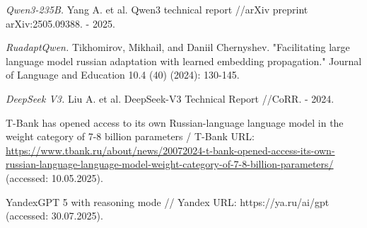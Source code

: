 \documentclass{superfri}
\begin{document}
\begin{thebibliography}{99}
\textit{Qwen3-235B.}
Yang A. et al. Qwen3 technical report //arXiv preprint arXiv:2505.09388. - 2025.

\textit{RuadaptQwen.}
Tikhomirov, Mikhail, and Daniil Chernyshev. "Facilitating large language model russian adaptation with learned embedding propagation." Journal of Language and Education 10.4 (40) (2024): 130-145.

\textit{DeepSeek V3.}
Liu A. et al. DeepSeek-V3 Technical Report //CoRR. - 2024.

T-Bank has opened access to its own Russian-language language model in the weight category of 7-8 billion parameters / T-Bank URL: \url{https://www.tbank.ru/about/news/20072024-t-bank-opened-access-its-own-russian-language-language-model-weight-category-of-7-8-billion-parameters/} (accessed: 10.05.2025).

YandexGPT 5 with reasoning mode // Yandex URL: https://ya.ru/ai/gpt (accessed: 30.07.2025).

\end{thebibliography}
\end{document}
